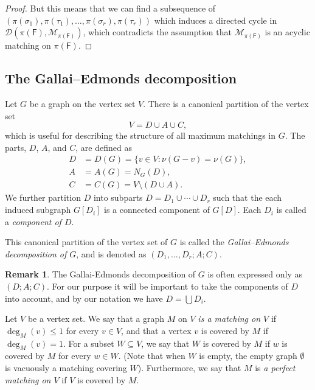 \documentclass[10pt]{amsart}
\newcommand{\MM}{\mathcal{M}}
\theoremstyle{definition}
\newtheorem{remark}[thm]{Remark}
\begin{document}
\begin{proof}
		But this means that we can find a subsequence of $(\pi(\sigma_1), \pi(\tau_1), \dots, \pi(\sigma_r), \pi(\tau_r))$ which induces a directed cycle in $\mathcal{D}(\pi(\mathsf{F}), \MM_{\pi(\mathsf{F})})$, which contradicts the assumption that $\MM_{\pi(\mathsf{F})}$ is an acyclic matching on $\pi(\mathsf{F})$.
	\end{proof}
	
	
	\subsection{The Gallai--Edmonds decomposition} \label{section_ge}
	Let $G$ be a graph on the vertex set $V$. There is a canonical partition of the vertex set \[V = D \cup A \cup C,\] which is useful for describing the structure of all maximum matchings in $G$. The parts, $D$, $A$, and $C$, are defined as
	\begin{align*}
	D &= D(G) = \{v\in V : \nu(G-v) = \nu(G)\}, \\ 
	A &= A(G) = N_G(D), \\ 
	C &= C(G) = V\setminus (D\cup A).
	\end{align*}
	We further partition $D$ into subparts $D = D_1\cup \cdots \cup D_r$ such that the each induced subgraph $G[D_i]$ is a connected component of $G[D]$. Each $D_i$ is called a {\em component of $D$}.
	
	This canonical partition of the vertex set of $G$ is called the {\em Gallai--Edmonds decomposition of $G$}, and is denoted as $(D_1, \dots, D_r ; A; C)$. 
	
	
	\begin{remark}
		The Gallai-Edmonds decomposition of $G$ is often expressed only as $(D; A; C)$. For our purpose it will be important to take the components of $D$ into account, and by our notation we have  $D = \bigcup D_i$. 
	\end{remark}
	
	Let $V$ be a vertex set. We say that a graph $M$ on $V$ \textit{is a matching on $V$} if $\deg_M(v)\leq 1$ for every $v\in V$, and that a vertex $v$ is covered by $M$ if $\deg_M(v)=1$. For a subset $W\subseteq V$, we say that $W$ is covered by $M$ if $w$ is covered by $M$ for every $w\in W$. (Note that when $W$ is empty, the empty graph $\emptyset$ is vacuously a matching covering $W$). Furthermore, we say that $M$ is \textit{a perfect matching on $V$} if $V$ is covered by $M$.  
	
\end{document}
